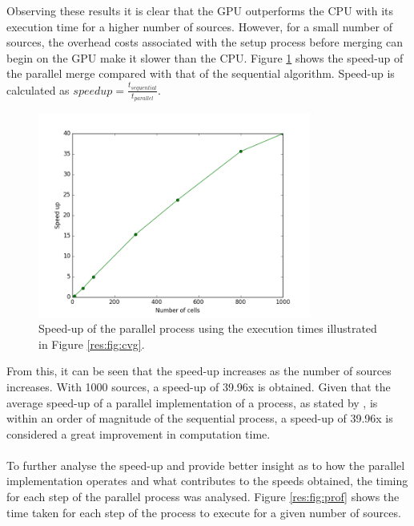 Observing these results it is clear that the GPU outperforms the CPU with its execution time for a higher number of sources. However, for a small number of sources, the overhead costs associated with the setup process before merging can begin on the GPU make it slower than the CPU. Figure \ref{res:fig:speed} shows the speed-up of the parallel merge compared with that of the sequential algorithm. Speed-up is calculated as $speedup = \frac{t_{sequential}}{t_{parallel}}$.
\begin{figure}[H]
\centering
\includegraphics[width=0.8\textwidth]{Images/result_speed.png}
\caption{Speed-up of the parallel process using the execution times illustrated in Figure \ref{res:fig:cvg}.}
\label{res:fig:speed}
\end{figure}
From this, it can be seen that the speed-up increases as the number of sources increases. With 1000 sources, a speed-up of 39.96x is obtained. Given that the average speed-up of a parallel implementation of a process, as stated by \citet{lee2010debunking}, is within an order of magnitude of the sequential process, a speed-up of 39.96x is considered a great improvement in computation time. 
\\
\\
To further analyse the speed-up and provide better insight as to how the parallel implementation operates and what contributes to the speeds obtained, the timing for each step of the parallel process was analysed. Figure \ref{res:fig:prof} shows the time taken for each step of the process to execute for a given number of sources.
